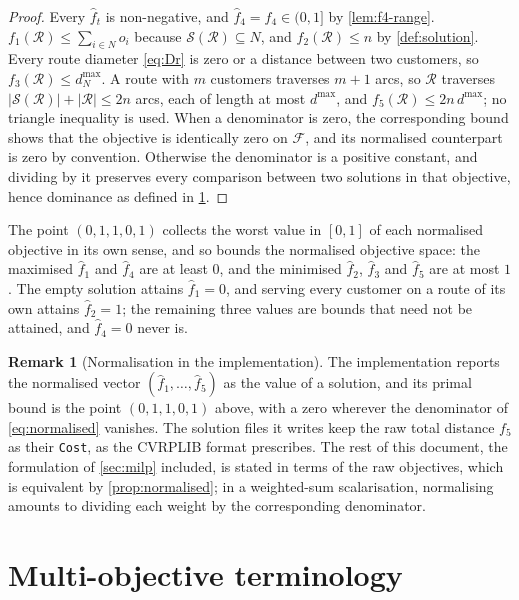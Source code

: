 \documentclass[11pt,a4paper]{article}
\theoremstyle{definition}
\newtheorem{remark}[definition]{Remark}
\theoremstyle{plain}
\newcommand{\Feas}{\mathcal{F}}
\newcommand{\Routes}{\mathcal{R}}
\newcommand{\Ground}{\mathcal{S}}
\newcommand{\Cust}{N}
\begin{document}
\begin{proof}
Every $\hat f_t$ is non-negative, and $\hat f_4 = f_4 \in (0,1]$ by
\cref{lem:f4-range}.  $f_1(\Routes) \le \sum_{i \in \Cust} o_i$ because
$\Ground(\Routes) \subseteq \Cust$, and $f_2(\Routes) \le n$ by
\cref{def:solution}.  Every route diameter \eqref{eq:Dr} is zero or a distance
between two customers, so $f_3(\Routes) \le d^{\max}_{\Cust}$.  A route with
$m$ customers traverses $m+1$ arcs, so $\Routes$ traverses
$|\Ground(\Routes)| + |\Routes| \le 2n$ arcs, each of length at most $d^{\max}$,
and $f_5(\Routes) \le 2n\,d^{\max}$; no triangle inequality is used.  When a
denominator is zero, the corresponding bound shows that the objective is
identically zero on $\Feas$, and its normalised counterpart is zero by
convention.  Otherwise the denominator is a positive constant, and dividing by
it preserves every comparison between two solutions in that objective, hence
dominance as defined in \cref{sec:pareto}.
\end{proof}

The point $(0,1,1,0,1)$ collects the worst value in $[0,1]$ of each normalised
objective in its own sense, and so bounds the normalised objective space: the
maximised $\hat f_1$ and $\hat f_4$ are at least $0$, and the minimised
$\hat f_2$, $\hat f_3$ and $\hat f_5$ are at most $1$.  The empty solution
attains $\hat f_1 = 0$, and serving every customer on a route of its own
attains $\hat f_2 = 1$; the remaining three values are bounds that need not be
attained, and $\hat f_4 = 0$ never is.

\begin{remark}[Normalisation in the implementation]
\label{rem:normalised-impl}
The implementation reports the normalised vector
$(\hat f_1,\dots,\hat f_5)$ as the value of a solution, and its primal bound is
the point $(0,1,1,0,1)$ above, with a zero wherever the denominator of
\eqref{eq:normalised} vanishes.  The solution files it writes keep the raw
total distance $f_5$ as their \texttt{Cost}, as the CVRPLIB format prescribes.
The rest of this document, the formulation of \cref{sec:milp} included, is
stated in terms of the raw objectives, which is equivalent by
\cref{prop:normalised}; in a weighted-sum scalarisation, normalising amounts to
dividing each weight by the corresponding denominator.
\end{remark}

\section{Multi-objective terminology}
\label{sec:pareto}
\end{document}
